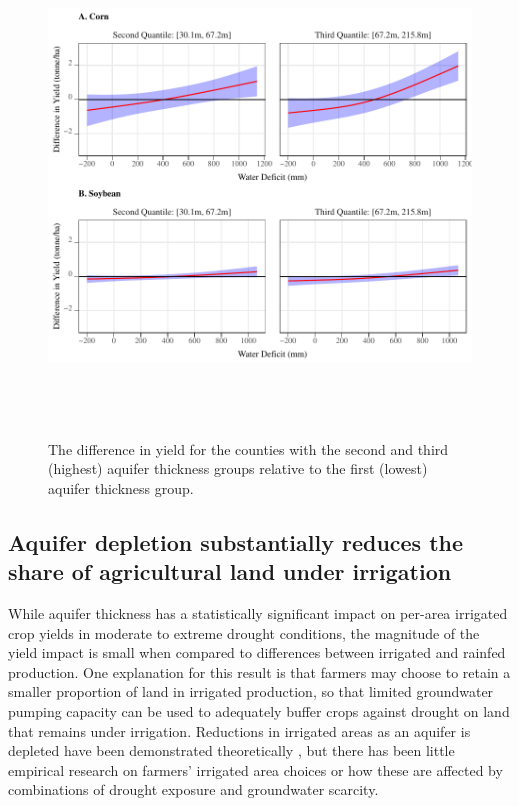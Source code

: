 \documentclass[
]{article}
\begin{document}
\begin{figure}[H]

{\centering \includegraphics[width=6in,height=500px,]{Figures/g_ir_yield_dif} 

}

\caption{The difference in yield for the counties with the second and third (highest) aquifer thickness groups relative to the first (lowest) aquifer thickness group.}\label{fig:yield-dif}
\end{figure}

\hypertarget{impact-share}{%
\subsection{Aquifer depletion substantially reduces the share of agricultural land under irrigation}\label{impact-share}}

While aquifer thickness has a statistically significant impact on per-area irrigated crop yields in moderate to extreme drought conditions, the magnitude of the yield impact is small when compared to differences between irrigated and rainfed production. One explanation for this result is that farmers may choose to retain a smaller proportion of land in irrigated production, so that limited groundwater pumping capacity can be used to adequately buffer crops against drought on land that remains under irrigation. Reductions in irrigated areas as an aquifer is depleted have been demonstrated theoretically \citep{rad2020effects, foster2014modeling, hrozencik2017heterogeneous, deines2020transitions}, but there has been little empirical research on farmers' irrigated area choices or how these are affected by combinations of drought exposure and groundwater scarcity.
\end{document}
